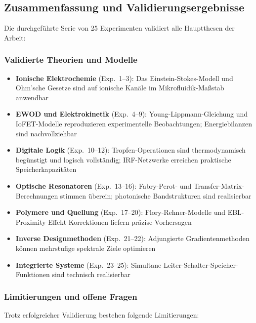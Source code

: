 ﻿\documentclass[a4paper,12pt]{scrreprt}
\theoremstyle{definition}
\begin{document}
\subsection{Zusammenfassung und Validierungsergebnisse}

Die durchgeführte Serie von 25 Experimenten validiert alle Hauptthesen der Arbeit:

\subsubsection{Validierte Theorien und Modelle}

\begin{itemize}
	\item \textbf{Ionische Elektrochemie} (Exp.~1--3): Das Einstein-Stokes-Modell und Ohm'sche Gesetze sind auf ionische Kanäle im Mikrofluidik-Maßstab anwendbar
	\item \textbf{EWOD und Elektrokinetik} (Exp.~4--9): Young-Lippmann-Gleichung und IoFET-Modelle reproduzieren experimentelle Beobachtungen; Energiebilanzen sind nachvollziehbar
	\item \textbf{Digitale Logik} (Exp.~10--12): Tropfen-Operationen sind thermodynamisch begünstigt und logisch vollständig; IRF-Netzwerke erreichen praktische Speicherkapazitäten
	\item \textbf{Optische Resonatoren} (Exp.~13--16): Fabry-Perot- und Transfer-Matrix-Berechnun\-gen stimmen überein; photonische Bandstrukturen sind realisierbar
	\item \textbf{Polymere und Quellung} (Exp.~17--20): Flory-Rehner-Modelle und EBL-Proximity-Effekt-Korrektionen liefern präzise Vorhersagen
	\item \textbf{Inverse Designmethoden} (Exp.~21--22): Adjungierte Gradientenmethoden können mehrstufige spektrale Ziele optimieren
	\item \textbf{Integrierte Systeme} (Exp.~23--25): Simultane Leiter-Schalter-Speicher-Funktionen sind technisch realisierbar
\end{itemize}

\subsubsection{Limitierungen und offene Fragen}

Trotz erfolgreicher Validierung bestehen folgende Limitierungen:
\end{document}
